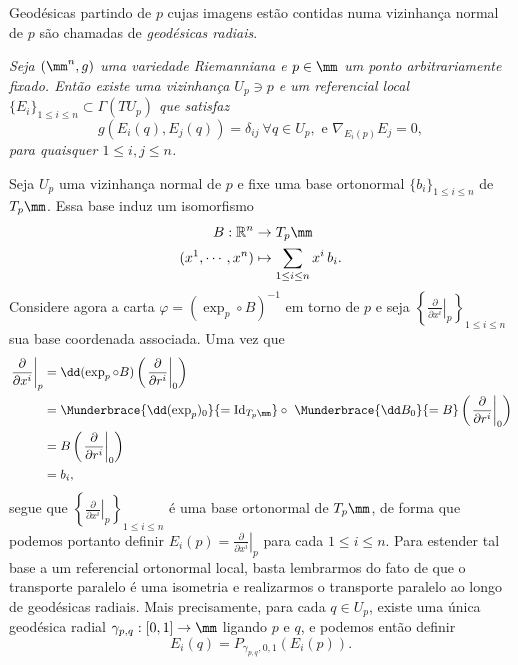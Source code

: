 \begin{deff}
Geodésicas partindo de $p$ cujas imagens estão contidas numa vizinhança normal de $p$ são chamadas de \emph{geodésicas radiais}.
\end{deff}
\begin{teorema}\label{refg}
\textit{
Seja $(\mm^n, g)$ uma variedade Riemanniana e $p \in \mm$ um ponto arbitrariamente fixado. Então existe uma vizinhança $U_p \ni p$ e um referencial local $\{E_i\}_{1 \leq i \leq n} \subset \Gamma(TU_p)$ que satisfaz
\[
g(E_i(q), E_j(q)) = \delta_{ij} \ \forall q \in U_p, \text{ e } \nabla_{E_i(p)} E_j = 0,
\]
para quaisquer $1 \leq i, j \leq n$.}
\end{teorema}
\begin{demm}
Seja $U_p$ uma vizinhança normal de $p$ e fixe uma base ortonormal $\{ b_i\}_{1 \leq i \leq n}$ de $T_p \mm$. Essa base induz um isomorfismo
\begin{align*}
B: \mathbb{R}^n &\to T_p \mm \\
(x^1, \cdots, x^n) &\mapsto \sum_{1 \leq i \leq n} x^i \, b_i. 
\end{align*}
Considere agora a carta $\varphi = \left(\exp_p \circ B\right)^{-1}$ em torno de $p$ e seja $\left\{\left.\frac{\partial}{\partial x^i} \right|_{p} \right\}_{1 \leq i \leq n}$ sua base coordenada associada. Uma vez que
\begin{align*}
\left.\frac{\partial}{\partial x^i} \right|_{p} &= \dd(\exp_p \circ B)\left(\left.\frac{\partial}{\partial r^i} \right|_{0} \right) \\
&= \Munderbrace{\dd(\exp_p)_0}{=\operatorname{Id}_{T_p \mm}} \circ \ \Munderbrace{\dd B_0}{=B} \left( \left.\frac{\partial}{\partial r^i} \right|_{0} \right) \\
&= B\left( \left.\frac{\partial}{\partial r^i} \right|_{0}\right) \\
&= b_i,
\end{align*}
segue que $\left\{\left.\frac{\partial}{\partial x^i} \right|_{p} \right\}_{1 \leq i \leq n}$ é uma base ortonormal de $T_p \mm$, de forma que podemos portanto definir $E_i(p) = \left.\frac{\partial}{\partial x^i} \right|_{p}$ para cada $1 \leq i \leq n$. Para estender tal base a um referencial ortonormal local, basta lembrarmos do fato de que o transporte paralelo é uma isometria e realizarmos o transporte paralelo ao longo de geodésicas radiais. Mais precisamente, para cada $q \in U_p$, existe uma única geodésica radial $\gamma_{p, q} : [0, 1] \to \mm$ ligando $p$ e $q$, e podemos então definir
\[
E_i(q) = P_{\gamma_{p, q}, 0, 1}(E_i(p)).
\]
\end{demm}

